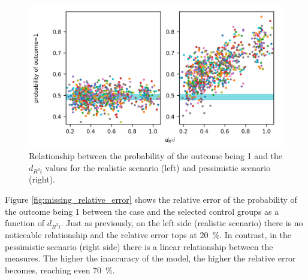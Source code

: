 		\begin{figure}[h!]
			\centering
                \captionsetup{justification=centering}
			\includegraphics[width=\textwidth]{assets/figures/control_group_selection/missing/relation.png}
			\caption{Relationship between the probability of the outcome being 1 and the $d_{R^{2}i}$ values for the realistic scenario (left) and pessimistic scenario (right). %
			}
			\label{fig:missing_relation}
		\end{figure}
								
		Figure \ref{fig:missing_relative_error} shows the relative error of the probability of the outcome being 1 between the case and the selected control groups as a function of $d_{R^{2}i}$. Just as previously, on the left side (realistic scenario) there is no noticeable relationship and the relative error tops at \SI{20}{\percent}. In contrast, in the pessimistic scenario (right side) there is a linear relationship between the measures. The higher the inaccuracy of the model, the higher the relative error becomes, reaching even \SI{70}{\percent}.
								
